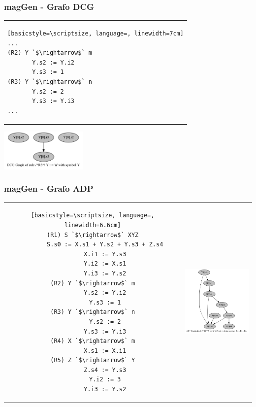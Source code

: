 \documentclass[10pt, xcolor=table]{beamer}
\begin{document}
\begin{frame}[fragile]
    \frametitle{magGen - Grafo DCG}
\begin{center}        
\begin{tabular}{p{6cm}}
\begin{lstlisting}[basicstyle=\scriptsize, language=, linewidth=7cm]
...
(R2) Y `$\rightarrow$` m
       Y.s2 := Y.i2
       Y.s3 := 1
(R3) Y `$\rightarrow$` n
       Y.s2 := 2
       Y.s3 := Y.i3
...
\end{lstlisting}
\end{tabular}
\end{center}
\begin{center}\includegraphics[width=160px, height=77px]{./12_dcg_graph.png}\end{center}
\end{frame}

\begin{frame}[fragile]
    \frametitle{magGen - Grafo ADP}

\begin{tabular}{c p{4.5cm}}
\hspace{-0.5cm}\begin{lstlisting}[basicstyle=\scriptsize, language=, linewidth=6.6cm]
(R1) S `$\rightarrow$` XYZ
       S.s0 := X.s1 + Y.s2 + Y.s3 + Z.s4
       X.i1 := Y.s3
       Y.i2 := X.s1
       Y.i3 := Y.s2
(R2) Y `$\rightarrow$` m
       Y.s2 := Y.i2
       Y.s3 := 1
(R3) Y `$\rightarrow$` n
       Y.s2 := 2
       Y.s3 := Y.i3
(R4) X `$\rightarrow$` m
       X.s1 := X.i1
(R5) Z `$\rightarrow$` Y
       Z.s4 := Y.s3
       Y.i2 := 3
       Y.i3 := Y.s2
\end{lstlisting}
&\hspace{0.2cm}\parbox[c]{1em}{\includegraphics[width=149px, height=150px]{./15_adp_graph.png}}
\end{tabular}

\end{frame}
\end{document}
